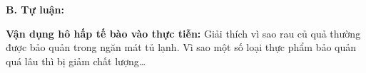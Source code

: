 \documentclass[13pt,a4paper]{article}
\begin{document}
\vspace{4pt}
{\color{mySub}\textbf{B. Tự luận:}}

\textbf{Vận dụng hô hấp tế bào vào thực tiễn:} Giải thích vì sao rau củ quả thường được bảo quản trong ngăn mát tủ lạnh. Vì sao một số loại thực phẩm bảo quản quá lâu thì bị giảm chất lượng\dots
\par\vspace{1pt}\noindent\dotfill\par\vspace{4pt}\noindent\dotfill\par\vspace{4pt}\noindent\dotfill\par\vspace{4pt}\noindent\dotfill\par\vspace{4pt}\noindent\dotfill\par\vspace{4pt}\noindent\dotfill\par\vspace{4pt}\noindent\dotfill\par\vspace{4pt}\noindent\dotfill\par\vspace{4pt}\noindent\dotfill\par\vspace{4pt}\noindent\dotfill\par\vspace{4pt}\noindent
\end{document}
